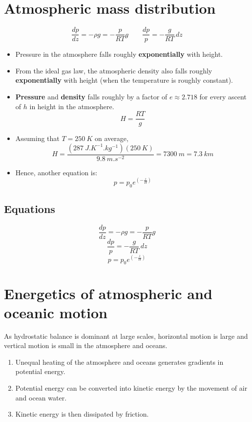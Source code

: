 \documentclass[11pt]{article}
\begin{document}
\section{Atmospheric mass distribution}
\label{sec:orgb7350b3}
\[\frac{dp}{dz} = - \rho g = - \frac{p}{RT}g \qquad \frac{dp}{p} = - \frac{g}{RT} \, dz\]
\begin{itemize}
\item Pressure in the atmosphere falls roughly \textbf{exponentially} with height.
\item From the ideal gas law, the atmospheric density also falls roughly \textbf{exponentially} with height (when the temperature is roughly constant).
\item \textbf{Pressure} and \textbf{density} falls roughly by a factor of \(e \approx 2.718\) for every ascent of \(h\) in height in the atmosphere.
\[H = \frac{RT}{g}\]

\item Assuming that \(T = \qty{250}{K}\) on average,
\[H = \frac{\left(\qty{287}{J.K^{-1}.kg^{-1}} \right) \left(\qty{250}{K} \right)}{\qty{9.8}{m.s^{-2}}} = \qty{7300}{m} = \qty{7.3}{km}\]

\item Hence, another equation is:
\[p = p_0 e^{\left(-\frac{z}{H} \right)}\]
\end{itemize}
\subsection{Equations}
\label{sec:orgbad9907}
\[\frac{dp}{dz} = - \rho g = - \frac{p}{RT}g\]
\[\frac{dp}{p} = - \frac{g}{RT} \, dz\]
\[p = p_0 e^{\left(-\frac{z}{H} \right)}\]
\section{Energetics of atmospheric and oceanic motion}
\label{sec:org71446ab}
As hydrostatic balance is dominant at large scales, horizontal motion is large and vertical motion is small in the atmosphere and oceans.

\begin{enumerate}
\item Unequal heating of the atmosphere and oceans generates gradients in potential energy.
\item Potential energy can be converted into kinetic energy by the movement of air and ocean water.
\item Kinetic energy is then dissipated by friction.
\end{enumerate}
\end{document}
